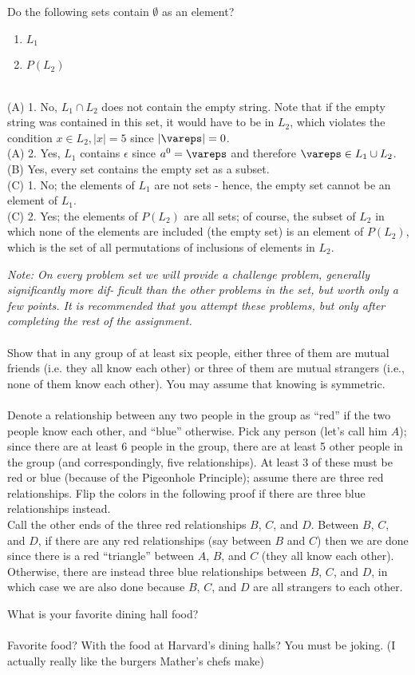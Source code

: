 \documentclass[solution, letterpaper]{cs121}
\begin{document}
\subproblem Do the following sets contain $\emptyset$ as an element?
\begin{enumerate}
\item $L_1$
\item $P(L_2)$
\end{enumerate}
\\(A) 1. No, $L_{1} \cap L_{2}$ does not contain the empty string.  Note that if the empty string was contained in this set, it would have to be in $L_{2}$, which violates the condition $x\in L_{2}, |x| = 5$ since $|\vareps| = 0$.
\\(A) 2. Yes, $L_{1}$ contains $\epsilon$ since $a^{0} = \vareps$ and therefore $\vareps \in L_{1} \cup L_{2}$.
\\(B) Yes, every set contains the empty set as a subset.
\\(C) 1. No; the elements of $L_{1}$ are not sets - hence, the empty set cannot be an element of $L_{1}$.
\\(C) 2. Yes; the elements of $P(L_{2})$ are all sets; of course, the subset of $L_{2}$ in which none of the elements are included (the empty set) is an element of $P(L_{2})$, which is the set of all permutations of inclusions of elements in $L_{2}$.

\textit{Note: On every problem set we will provide a challenge problem, generally significantly more dif- ficult than the other problems in the set, but worth only a few points. It is recommended that you attempt these problems, but only after completing the rest of the assignment.} \\\\
Show that in any group of at least six people, either three of them are mutual friends (i.e. they all know each other) or three of them are mutual strangers (i.e., none of them know each other). You may assume that knowing is symmetric.
\\\\
Denote a relationship between any two people in the group as ``red'' if the two people know each other, and ``blue'' otherwise.  Pick any person (let's call him $A$); since there are at least 6 people in the group, there are at least 5 other people in the group (and correspondingly, five relationships).  At least 3 of these must be red or blue (because of the Pigeonhole Principle); assume there are three red relationships.  Flip the colors in the following proof if there are three blue relationships instead.
\\\indent Call the other ends of the three red relationships $B$, $C$, and $D$.  Between $B$, $C$, and $D$, if there are any red relationships (say between $B$ and $C$) then we are done since there is a red ``triangle'' between $A$, $B$, and $C$ (they all know each other).  Otherwise, there are instead three blue relationships between $B$, $C$, and $D$, in which case we are also done because $B$, $C$, and $D$ are all strangers to each other.

What is your favorite dining hall food?
\\\\
Favorite food?  With the food at Harvard's dining halls?  You must be joking.  (I actually really like the burgers Mather's chefs make)
\end{document}
